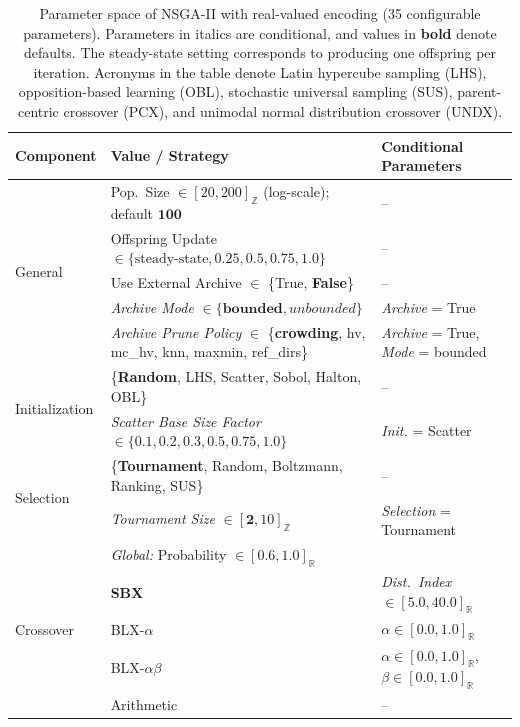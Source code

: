 \documentclass[journal]{IEEEtran}
\newcommand{\Intdomain}[1]{[#1]_{\mathbb{Z}}}
\newcommand{\Realdomain}[1]{[#1]_{\mathbb{R}}}
\begin{document}
\begin{table}[htbp]
\centering
\caption{Parameter space of NSGA-II with real-valued encoding (35 configurable parameters). Parameters in italics are conditional, and values in \textbf{bold} denote defaults. The steady-state setting corresponds to producing one offspring per iteration. Acronyms in the table denote Latin hypercube sampling (LHS), opposition-based learning (OBL), stochastic universal sampling (SUS), parent-centric crossover (PCX), and unimodal normal distribution crossover (UNDX).}
\label{tab:parameter_space}
\begin{tabular}{lll}
\toprule
\textbf{Component} & \textbf{Value / Strategy} & \textbf{Conditional Parameters} \\ \midrule
\multirow{5}{*}{General} & Pop.\ Size $\in \Intdomain{20, 200}$ (log-scale); default $\mathbf{100}$ & -- \\
 & Offspring Update $\in \{\text{steady-state}, 0.25, 0.5, 0.75, \mathbf{1.0}\}$ & -- \\
 & Use External Archive $\in$ \{True, \textbf{False}\} & -- \\
 & \textit{Archive Mode} $\in \{\textbf{bounded}, unbounded\}$ & \textit{Archive} = True \\
 & \textit{Archive Prune Policy} $\in$ \{\textbf{crowding}, hv, mc\_hv, knn, maxmin, ref\_dirs\} & \textit{Archive} = True, \textit{Mode} = bounded \\ \midrule
\multirow{2}{*}{Initialization} & \{\textbf{Random}, LHS, Scatter, Sobol, Halton, OBL\} & -- \\
 & \textit{Scatter Base Size Factor} $\in \{0.1, 0.2, 0.3, 0.5, 0.75, 1.0\}$ & \textit{Init.} = Scatter \\ \midrule
\multirow{2}{*}{Selection} & \{\textbf{Tournament}, Random, Boltzmann, Ranking, SUS\} & -- \\
 & \textit{Tournament Size} $\in \Intdomain{\mathbf{2}, 10}$ & \textit{Selection} = Tournament \\ \midrule
\multirow{11}{*}{Crossover} & \multicolumn{2}{l}{\textit{Global:} Probability $\in \Realdomain{0.6, 1.0}$} \\
 & \textbf{SBX} & \textit{Dist.\ Index} $\in \Realdomain{5.0, 40.0}$ \\
 & BLX-$\alpha$ & $\alpha \in \Realdomain{0.0, 1.0}$ \\
 & BLX-$\alpha\beta$ & $\alpha \in \Realdomain{0.0, 1.0}$, $\beta \in \Realdomain{0.0, 1.0}$ \\
 & Arithmetic & -- \\

\end{tabular}
\end{table}
\end{document}
